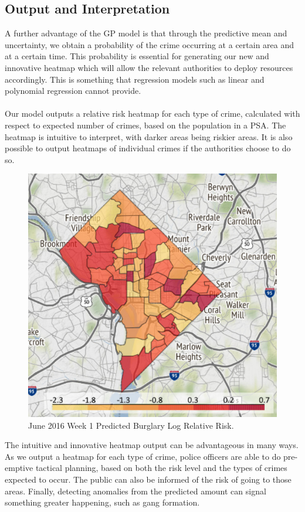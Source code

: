 \documentclass[a4paper, 10pt, conference]{ieeeconf}
\begin{document}
	\subsection{Output and Interpretation}
	A further advantage of the GP model is that through the predictive mean and uncertainty, we obtain a probability of the crime occurring at a certain area and at a certain time.
	This probability is essential for generating our new and innovative heatmap which will allow the relevant authorities to deploy resources accordingly.
	This is something that regression models such as linear and polynomial regression cannot provide.\\ \\

	Our model outputs a relative risk heatmap for each type of crime, calculated with respect to expected number of crimes, based on the population in a PSA.
	The heatmap is intuitive to interpret, with darker areas being riskier areas.
	It is also possible to output heatmaps of individual crimes if the authorities choose to do so.

	\begin{figure}[!ht]
		\includegraphics[width=\linewidth]{./p1.png}
		\caption{June 2016 Week 1 Predicted Burglary Log Relative Risk.}
		\label{p1}
	\end{figure}

	The intuitive and innovative heatmap output can be advantageous in many ways.
	As we output a heatmap for each type of crime, police officers are able to do pre-emptive tactical planning, based on both the risk level and the types of crimes expected to occur.
	The public can also be informed of the risk of going to those areas. 
	Finally, detecting anomalies from the predicted amount can signal something greater happening, such as gang formation.
	
\end{document}
